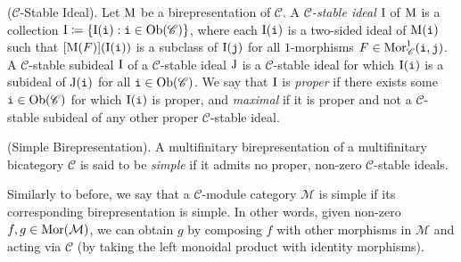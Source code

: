 \noindent\begin{definition}\textnormal{($\mathscr{C}$-Stable Ideal).} Let $\textnormal{M}$ be a birepresentation of $\mathscr{C}$. A %
{\em $\mathscr{C}$-stable ideal} $\textnormal{I}$ of $\textnormal{M}$ is a collection $\textnormal{I} \coloneqq \{\textnormal{I}(\textnormal{\texttt{i}}) : \textnormal{\texttt{i}} \in \textnormal{Ob}(\mathscr{C})\}$, where each $\textnormal{I}(\textnormal{\texttt{i}})$ is a %
two-sided ideal of $\textnormal{M}(\textnormal{\texttt{i}})$ such that $[\textnormal{M}(F)](\textnormal{I}(\textnormal{\texttt{i}}))$ is a subclass of $\textnormal{I}(\textnormal{\texttt{j}})$ for all $1$-morphisms $F \in \textnormal{Mor}_\mathscr{C}^1(\textnormal{\texttt{i}}, \textnormal{\texttt{j}})$. %
A $\mathscr{C}$-stable subideal $\textnormal{I}$ of a $\mathscr{C}$-stable ideal $\textnormal{J}$ is a $\mathscr{C}$-stable ideal for which $\textnormal{I}(\textnormal{\texttt{i}})$ is a subideal of $\textnormal{J}(\textnormal{\texttt{i}})$ for all $\textnormal{\texttt{i}} \in \textnormal{Ob}(\mathscr{C})$. We say that $\textnormal{I}$ is {\em proper} if there exists some $\textnormal{\texttt{i}} \in \textnormal{Ob}(\mathscr{C})$ for which $\textnormal{I}(\textnormal{\texttt{i}})$ is proper, and {\em maximal} if it is proper and not a $\mathscr{C}$-stable subideal of any other proper $\mathscr{C}$-stable ideal.\\
\end{definition}

\noindent\begin{definition}\textnormal{(Simple Birepresentation).} %
A multifinitary birepresentation of a multifinitary bicategory $\mathscr{C}$ is said to be {\em simple} if it admits no proper, non-zero $\mathscr{C}$-stable ideals.\\
\end{definition}

\noindent Similarly to before, we say that a $\mathcal{C}$-module category $\mathcal{M}$ is simple if its corresponding birepresentation is simple. In other words, given non-zero $f, g \in \textnormal{Mor}(\mathcal{M})$, we can obtain $g$ by composing $f$ with other morphisms in $\mathcal{M}$ and acting via $\mathcal{C}$ (by taking the left monoidal product with identity morphisms).\\

